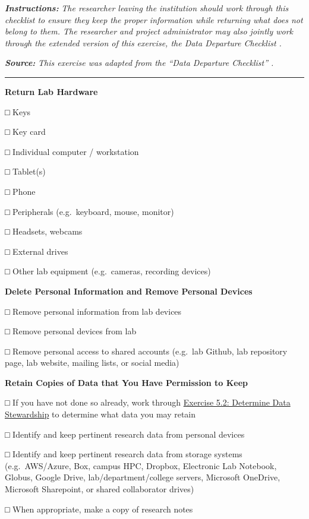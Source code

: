 \documentclass[
]{book}
\begin{document}
\textbf{\emph{Instructions:}} \emph{The researcher leaving the institution should work through this checklist to ensure they keep the proper information while returning what does not belong to them. The researcher and project administrator may also jointly work through the extended version of this exercise, the Data Departure Checklist \citep{goben_data_2023}.}

\textbf{\emph{Source:}} \emph{This exercise was adapted from the ``Data Departure Checklist'' \citep{goben_data_2023}.}

\begin{center}\rule{0.5\linewidth}{0.5pt}\end{center}

\textbf{Return Lab Hardware}

□ Keys

□ Key card

□ Individual computer / workstation

□ Tablet(s)

□ Phone

□ Peripherals (e.g.~keyboard, mouse, monitor)

□ Headsets, webcams

□ External drives

□ Other lab equipment (e.g.~cameras, recording devices)

\textbf{Delete Personal Information and Remove Personal Devices}

□ Remove personal information from lab devices

□ Remove personal devices from lab

□ Remove personal access to shared accounts (e.g.~lab Github, lab repository page, lab website, mailing lists, or social media)

\textbf{Retain Copies of Data that You Have Permission to Keep}

□ If you have not done so already, work through \protect\hyperlink{data-governance}{Exercise 5.2: Determine Data Stewardship} to determine what data you may retain

□ Identify and keep pertinent research data from personal devices

□ Identify and keep pertinent research data from storage systems (e.g.~AWS/Azure, Box, campus HPC, Dropbox, Electronic Lab Notebook, Globus, Google Drive, lab/department/college servers, Microsoft OneDrive, Microsoft Sharepoint, or shared collaborator drives)

□ When appropriate, make a copy of research notes
\end{document}
